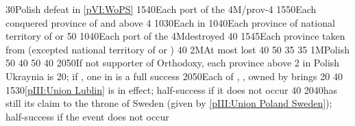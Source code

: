 %
%
{}{30}{Polish defeat in \ref{pVI:WoPS}}%
%
%
{15}{40}{Each port of the \regionBaltique}%
%
\EUobjective4M{\payscrimee/\paysmoldavie}{prov-4}%
{15}{50}{Each conquered province of  and  above
  4}%
%
%
%
{10}{30}{Each \COL in \granderegionAlaska}%
%
%
%
{10}{40}{Each province of national territory of \paysgeorgie or \paysperse}%
%
%
{}{50}{}%
%
%
{10}{40}{Each port of the \regionBaltique}%
%
\EUobjective4M{\payscrimee destroyed}{}%
{}{40}{}%
%
%
{15}{45}{Each province taken from \paysmajeurTurquie (excepted national
  territory of \paysgeorgie or \paysperse)}%
%
 
%
%
{}{40}{}%
%
\EUobjective2M{At most \provinceSmolenska lost}{}%
{}{40}{}%
%
%
{}{50}{}%
%
%
{}{35}{}%
%
%
{}{35}{}%
%
%
\EUobjective1M{Polish \provinceSmolenska}{}%
{}{50}{}%
%
%
{}{40}{}%
%
%
{}{50}{}%
%
%
{}{40}{}%
%
%
{20}{50}{If not supporter of Orthodoxy, each province above 2 in Polish
  Ukraynia is 20\VPs; if \Xorthodoxe, one \COL in \continentSiberia is a full
  success}%
%
%
%
{20}{50}{Each of \provinceKurland, \provinceMemel, \provincePreussen owned by
  \paysmajeurPologne brings 20\VPs}%
%
%
{}{40}{}%
%
%
{15}{30}{\ref{pIII:Union Lublin} is in effect; half-success if it does not
  occur}%
%
%
{}{40}{}%
%
%
{20}{40}{\POL has still its claim to the throne of Sweden (given by
  \ref{pIII:Union Poland Sweden}); half-success if the event does not occur}%
%
%
%
